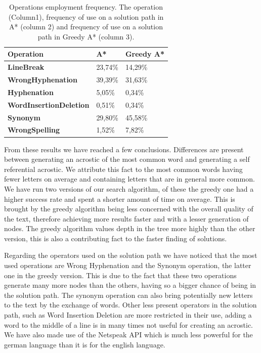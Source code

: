 \documentclass[11pt]{reportAlternative}
\begin{document}
\begin{table}[h]
\centering
\begin{tabular}{l | l | l}
	\hline
	\textbf{Operation} &	\textbf{A*} &	\textbf{Greedy A*} \\ \hline
	\textbf{LineBreak} &	23,74\% &	14,29\% \\
	\textbf{WrongHyphenation} &	39,39\% &	31,63\% \\
	\textbf{Hyphenation} &	5,05\% &	0,34\% \\
	\textbf{WordInsertionDeletion} &	0,51\% &	0,34\% \\
	\textbf{Synonym} &	29,80\% &	45,58\% \\
	\textbf{WrongSpelling} &	1,52\% &	7,82\% \\
	\hline
\end{tabular}
\label{tab:operations_freq}
\caption{Operations employment frequency. The operation (Column1), frequency of use on a solution path in A* (column 2) and frequency of use on a solution path in Greedy A* (column 3).}
\end{table}

From these results we have reached a few conclusions. Differences are present between generating an acrostic of the most common word and generating a self referential acrostic. We attribute this fact to the most common words having fewer letters on average and containing letters that are in general more common. We have run two versions of our search algorithm, of these the greedy one had a higher success rate and spent a shorter amount of time on average. This is brought by the greedy algorithm being less concerned with the overall quality of the text, therefore achieving more results faster and with a lesser generation of nodes. The greedy algorithm values depth in the tree more highly than the other version, this is also a contributing fact to the faster finding of solutions.

Regarding the operators used on the solution path we have noticed that the most used operations are Wrong Hyphenation and the Synonym operation, the latter one in the greedy version. This is due to the fact that these two operations generate many more nodes than the others, having so a bigger chance of being in the solution path. The synonym operation can also bring potentially new letters to the text by the exchange of words. Other less present operators in the solution path, such as Word Insertion Deletion are more restricted in their use, adding a word to the middle of a line is in many times not useful for creating an acrostic. We have also made use of the Netspeak API which is much less powerful for the german language than it is for the english language. 
\end{document}
